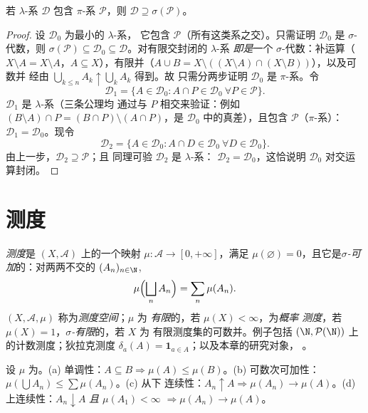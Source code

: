 \begin{theorem}[戴金 $\pi$--$\lambda$ 引理]
\label{thm:b3:measure:dynkin}
若 $\lambda$-系 $\mathcal D$ 包含 $\pi$-系
$\mathcal P$，则 $\mathcal D \supseteq
\sigma(\mathcal P)$。
\end{theorem}

\begin{proof}
设 $\mathcal D_0$ 为最小的 $\lambda$-系，
它包含 $\mathcal P$（所有这类系之交）。只需证明
$\mathcal D_0$ 是 $\sigma$-代数，则
$\sigma(\mathcal P) \subseteq \mathcal D_0 \subseteq \mathcal
D$。对有限交封闭的 $\lambda$-系
\emph{即是}一个 $\sigma$-代数：补运算（$X \setminus A = X
\setminus A$，$A \subseteq X$），有限并（$A \cup B =
X \setminus ((X\setminus A)\cap(X\setminus B))$），以及可数并
经由 $\bigcup_{k \leq n}A_k \uparrow \bigcup_kA_k$ 得到。故
只需分两步证明 $\mathcal D_0$ 是 $\pi$-系。令
\[
\mathcal D_1 = \{A \in \mathcal D_0 : A \cap P \in \mathcal
D_0 \ \forall P \in \mathcal P\}.
\]
$\mathcal D_1$ 是 $\lambda$-系（三条公理均
通过与 $P$ 相交来验证：例如 $(B\setminus A)\cap P
= (B \cap P)\setminus(A \cap P)$，是
$\mathcal D_0$ 中的真差），且包含 $\mathcal P$（$\pi$-系）：
$\mathcal D_1 = \mathcal D_0$。现令
\[
\mathcal D_2 = \{A \in \mathcal D_0 : A \cap D \in \mathcal
D_0\ \forall D \in \mathcal D_0\}.
\]
由上一步，$\mathcal D_2 \supseteq \mathcal P$；且
同理可验 $\mathcal D_2$ 是 $\lambda$-系：
$\mathcal D_2 = \mathcal D_0$，这恰说明
$\mathcal D_0$ 对交运算封闭。
\end{proof}

\section{测度}

\begin{definition}\label{def:b3:measure:measure}
\emph{测度}是 $(X, \mathcal A)$ 上的一个映射
$\mu \colon \mathcal A \to [0, +\infty]$，满足 $\mu(\varnothing)
= 0$，且它是\emph{$\sigma$-可加}的：对两两不交的
$(A_n)_{n\in\N}$,
\[
\mu\Bigl(\bigsqcup_n A_n\Bigr) = \sum_n \mu(A_n).
\]
$(X, \mathcal A, \mu)$ 称为\emph{测度空间}；$\mu$ 为
\emph{有限}的，若 $\mu(X) < \infty$，为\emph{概率
测度}，若 $\mu(X) = 1$，\emph{$\sigma$-有限}的，若 $X$ 为
有限测度集的可数并。例子包括
$(\N, \mathcal P(\N))$ 上的计数测度；狄拉克测度 $\delta_a(A)
= \mathbf 1_{a \in A}$；以及本章的研究对象，
。
\end{definition}

\begin{proposition}\label{prop:b3:measure:basics}
设 $\mu$ 为。(a) 单调性：$A \subseteq B
\Rightarrow \mu(A) \leq \mu(B)$。(b) 可数次可加性：
$\mu(\bigcup A_n) \leq \sum\mu(A_n)$。(c) 从下
连续性：$A_n \uparrow A \Rightarrow \mu(A_n) \to \mu(A)$。(d)
上连续性：$A_n \downarrow A$ \emph{且
$\mu(A_1) < \infty$} $\Rightarrow \mu(A_n) \to \mu(A)$。
\end{proposition}

